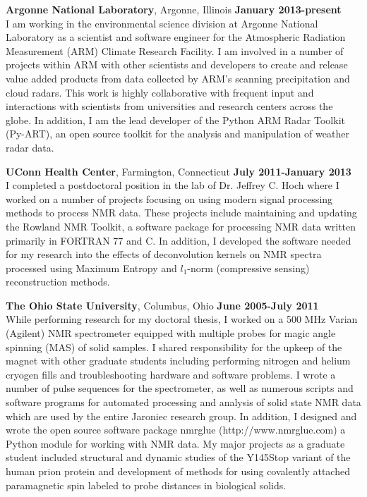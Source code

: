 \documentclass[margin,line]{res}
\begin{document}
\begin{resume}
{\bf Argonne National Laboratory}, Argonne, Illinois
\hfill {\bf January 2013-present}\\
I am working in the environmental science division at
Argonne National Laboratory as a scientist and software engineer
for the Atmospheric Radiation Measurement (ARM) Climate Research Facility.
I am involved in a number of projects within ARM with other scientists and
developers to create and release value added products from data collected
by ARM’s scanning precipitation and cloud radars.  This work is highly
collaborative with frequent input and interactions with scientists from
universities and research centers across the globe.  In addition,
I am the lead developer of the Python ARM Radar Toolkit (Py-ART),
an open source toolkit for the analysis and manipulation of weather radar data.

{\bf UConn Health Center}, Farmington, Connecticut
\hfill {\bf July 2011-January 2013}\\
I completed a postdoctoral position in the lab of Dr. Jeffrey C. Hoch
where I worked on a number of projects focusing on using modern signal
processing methods to process NMR data. These projects include maintaining
and updating the Rowland NMR Toolkit, a software package for processing
NMR data written primarily in FORTRAN 77 and C.
In addition, I developed the software needed for my research into the
effects of deconvolution kernels on NMR spectra processed using
Maximum Entropy and $l_1$-norm (compressive sensing) reconstruction methods.

\vspace{-0.1in}

{\bf The Ohio State University}, Columbus, Ohio
\hfill {\bf June 2005-July 2011}\\
While performing research for my doctoral thesis, I worked on a
500 MHz Varian (Agilent) NMR spectrometer equipped with multiple probes
for magic angle spinning (MAS) of solid samples.  I shared responsibility for
the upkeep of the magnet with other graduate students including
performing nitrogen and helium cryogen fills and troubleshooting hardware
and software problems. I wrote a number of pulse sequences for the
spectrometer, as well as numerous scripts and software programs for
automated processing and analysis of solid state NMR data which are used
by the entire Jaroniec research group.  In addition, I designed and wrote
the open source software package nmrglue (http://www.nmrglue.com) a
Python module for working with NMR data.
My major projects as a graduate student included structural and
dynamic studies of the Y145Stop variant of the human prion protein and
development of methods for using covalently attached paramagnetic spin
labeled to probe distances in biological solids.


\end{resume}
\end{document}
